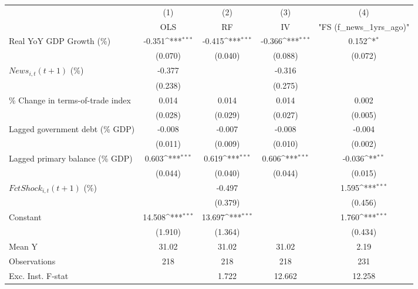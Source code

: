 {
\def\sym#1{\ifmmode^{#1}\else\(^{#1}\)\fi}
\begin{tabular}{l*{4}{c}}
\toprule
                    &\multicolumn{1}{c}{(1)}&\multicolumn{1}{c}{(2)}&\multicolumn{1}{c}{(3)}&\multicolumn{1}{c}{(4)}\\
                    &\multicolumn{1}{c}{OLS}&\multicolumn{1}{c}{RF}&\multicolumn{1}{c}{IV}&\multicolumn{1}{c}{ "FS (f_news_1yrs_ago)" }\\
\midrule
Real YoY GDP Growth (\%)&      -0.351\sym{***}&      -0.415\sym{***}&      -0.366\sym{***}&       0.152\sym{*}  \\
                    &     (0.070)         &     (0.040)         &     (0.088)         &     (0.072)         \\
\addlinespace
$ News_{i,t}(t+1)$ (\%)&      -0.377         &                     &      -0.316         &                     \\
                    &     (0.238)         &                     &     (0.275)         &                     \\
\addlinespace
\% Change in terms-of-trade index&       0.014         &       0.014         &       0.014         &       0.002         \\
                    &     (0.028)         &     (0.029)         &     (0.027)         &     (0.005)         \\
\addlinespace
Lagged government debt (\% GDP)&      -0.008         &      -0.007         &      -0.008         &      -0.004         \\
                    &     (0.011)         &     (0.009)         &     (0.010)         &     (0.002)         \\
\addlinespace
Lagged primary balance (\% GDP)&       0.603\sym{***}&       0.619\sym{***}&       0.606\sym{***}&      -0.036\sym{**} \\
                    &     (0.044)         &     (0.040)         &     (0.044)         &     (0.015)         \\
\addlinespace
$ FctShock_{i,t}(t+1)$ (\%)&                     &      -0.497         &                     &       1.595\sym{***}\\
                    &                     &     (0.379)         &                     &     (0.456)         \\
\addlinespace
Constant            &      14.508\sym{***}&      13.697\sym{***}&                     &       1.760\sym{***}\\
                    &     (1.910)         &     (1.364)         &                     &     (0.434)         \\
\midrule
Mean Y              &       31.02         &       31.02         &       31.02         &        2.19         \\
Observations        &         218         &         218         &         218         &         231         \\
Exc. Inst. F-stat   &                     &       1.722         &      12.662         &      12.258         \\
\bottomrule
\end{tabular}
}
